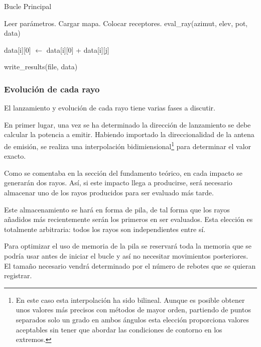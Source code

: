 \begin{algorithm}
    \caption{Bucle Principal}
    \label{euclid}
    \begin{algorithmic}[1]
        \State Leer parámetros.
        \State Cargar mapa.
        \State Colocar receptores.
        \For{azimut $\in [0, 360)$}
                \State eval\_ray(azimut, elev, pot, data)
            \EndFor
        \EndFor

                \State data[i][0] $\gets$ data[i][0] + data[i][j]
            \EndFor
        \EndFor

        \State write\_results(file, data)
    \end{algorithmic}
\end{algorithm}

\subsubsection*{Evolución de cada rayo}

El lanzamiento y evolución de cada rayo tiene varias fases a discutir.

En primer lugar, una vez se ha determinado la dirección de lanzamiento se debe calcular la potencia a emitir.
Habiendo importado la direccionalidad de la antena de emisión, se realiza una interpolación bidimiensional\footnote{En este caso esta interpolación ha sido bilineal. Aunque es posible obtener unos valores más precisos con métodos de mayor orden, partiendo de puntos separados solo un grado en ambos ángulos esta elección proporciona valores aceptables sin tener que abordar las condiciones de contorno en los extremos.} para determinar el valor exacto.

Como se comentaba en la sección del fundamento teórico, en cada impacto se generarán dos rayos.
Así, si este impacto llega a producirse, será necesario almacenar uno de los rayos producidos para ser evaluado más tarde.

Este almacenamiento se hará en forma de pila, de tal forma que los rayos añadidos más recientemente serán los primeros en ser evaluados.
Esta elección es totalmente arbitraria: todos los rayos son independientes entre sí.

Para optimizar el uso de memoria de la pila se reservará toda la memoria que se podría usar antes de iniciar el bucle y así no necesitar movimientos posteriores.
El tamaño necesario vendrá determinado por el número de rebotes que se quieran registrar.

